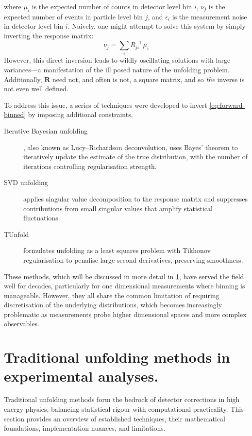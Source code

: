     where \(\mu_{i}\) is the expected number of counts in detector level bin \(i\), \(\nu_{j}\) is the expected number of events in particle level bin \(j\), and \(\epsilon_i\) is the measurement noise in detector level bin \(i\).
    Naively, one might attempt to solve this system by simply inverting the response matrix:
    \begin{equation}
        \nu_j = \sum_i R^{-1}_{ji}\,\mu_i
    \end{equation}
    However, this direct inversion leads to wildly oscillating solutions with large variances---a manifestation of the ill posed nature of the unfolding problem.
    Additionally, \(\mathbf{R}\) need not, and often is not, a square matrix, and so \emph{the} inverse is not even well defined.
    
    To address this issue, a series of techniques were developed to invert \cref{eq:forward-binned} by imposing additional constraints.
    \begin{description}
    \item[Iterative Bayesian unfolding~\cite{richardson_bayesian-based_1972, lucy_iterative_1974, Schmitt2017DataPhysics}], also known as Lucy--Richardson deconvolution, uses Bayes' theorem to iteratively update the estimate of the true distribution, with the number of iterations controlling regularisation strength.
    \item[SVD unfolding~\cite{hocker_svd_1996}] applies singular value decomposition to the response matrix and suppresses contributions from small singular values that amplify statistical fluctuations.
    \item[TUnfold~\cite{schmitt_tunfold_2012}] formulates unfolding as a least squares problem with Tikhonov regularisation to penalise large second derivatives, preserving smoothness.
    \end{description}

These methods, which will be discussed in more detail in \cref{sec:binned-methods}, have served the field well for decades, particularly for one dimensional measurements where binning is manageable.
%
However, they all share the common limitation of requiring discretisation of the underlying distributions, which becomes increasingly problematic as measurements probe higher dimensional spaces and more complex observables.


\section{Traditional unfolding methods in experimental analyses.}
\label{sec:binned-methods}
Traditional unfolding methods form the bedrock of detector corrections in high energy physics, balancing statistical rigour with computational practicality.
%
This section provides an overview of established techniques, their mathematical foundations, implementation nuances, and limitations.

